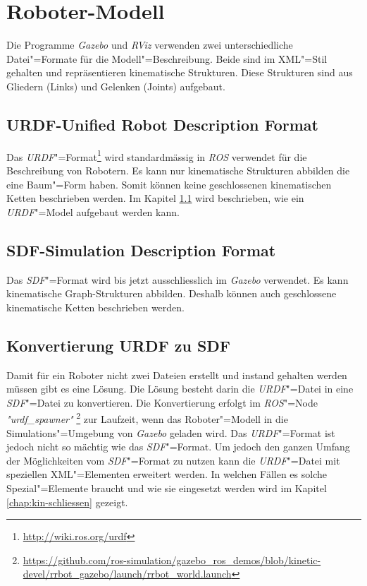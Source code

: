 

\section{Roboter-Modell} %
\label{chap:roboter-modell}

Die Programme \textit{Gazebo} und \textit{RViz} verwenden zwei unterschiedliche Datei"=Formate für die Modell"=Beschreibung.
Beide sind im XML"=Stil gehalten und repräsentieren kinematische Strukturen.
Diese Strukturen sind aus Gliedern (Links) und Gelenken (Joints) aufgebaut.

\subsection{URDF-Unified Robot Description Format}
\label{chap:urdf}
Das \textit{URDF}"=Format\footnote{\url{http://wiki.ros.org/urdf}} wird standardmässig in \textit{ROS} verwendet für die Beschreibung von Robotern.
Es kann nur kinematische Strukturen abbilden die eine Baum"=Form haben.
Somit können keine geschlossenen kinematischen Ketten beschrieben werden.
Im Kapitel \ref{chap:urdf} wird beschrieben, wie ein \textit{URDF}"=Model aufgebaut werden kann.

\subsection{SDF-Simulation Description Format}
\label{chap:sdf}
Das \textit{SDF}"=Format wird bis jetzt ausschliesslich im \textit{Gazebo} verwendet.
Es kann kinematische Graph-Strukturen abbilden.
Deshalb können auch geschlossene kinematische Ketten beschrieben werden.

\subsection{Konvertierung URDF zu SDF}
\label{chap:konvertierung}
Damit für ein Roboter nicht zwei Dateien erstellt und instand gehalten werden müssen gibt es eine Lösung.
Die Lösung besteht darin die \textit{URDF}"=Datei in eine \textit{SDF}"=Datei zu konvertieren.
Die Konvertierung erfolgt im \textit{ROS}"=Node \textit{\textit{"}urdf\_spawner"} \footnote{\url{https://github.com/ros-simulation/gazebo\_ros\_demos/blob/kinetic-devel/rrbot\_gazebo/launch/rrbot\_world.launch}} zur Laufzeit, wenn das Roboter"=Modell in die Simulations"=Umgebung von \textit{Gazebo} geladen wird.
Das \textit{URDF}"=Format ist jedoch nicht so mächtig wie das \textit{SDF}"=Format.
Um jedoch den ganzen Umfang der Möglichkeiten vom \textit{SDF}"=Format zu nutzen kann die \textit{URDF}"=Datei mit speziellen XML"=Elementen erweitert werden.
In welchen Fällen es solche Spezial"=Elemente braucht und wie sie eingesetzt werden wird im Kapitel \ref{chap:kin-schliessen} gezeigt. 

